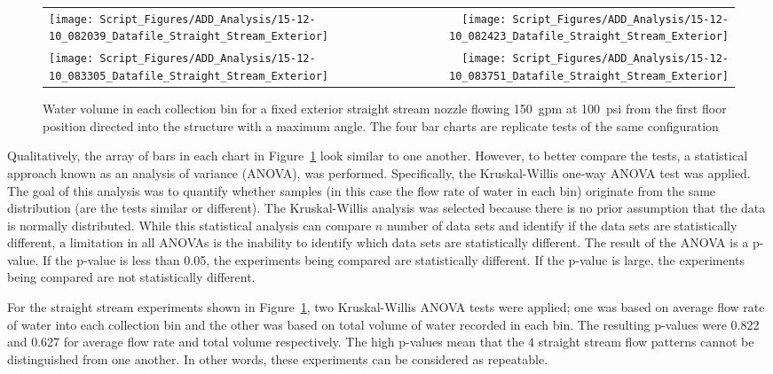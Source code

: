 \documentclass{article}
\begin{document}
\begin{figure}[ht]
\begin{tabular*}{\textwidth}{lr}
\texttt{[image: Script\_Figures/ADD\_Analysis/15-12-10\_082039\_Datafile\_Straight\_Stream\_Exterior]} &
\texttt{[image: Script\_Figures/ADD\_Analysis/15-12-10\_082423\_Datafile\_Straight\_Stream\_Exterior]} \\
\texttt{[image: Script\_Figures/ADD\_Analysis/15-12-10\_083305\_Datafile\_Straight\_Stream\_Exterior]} &
\texttt{[image: Script\_Figures/ADD\_Analysis/15-12-10\_083751\_Datafile\_Straight\_Stream\_Exterior]} \\
\end{tabular*}
\caption{Water volume in each collection bin for a fixed exterior straight stream nozzle flowing 150~gpm at 100~psi from the first floor position directed into the structure with a maximum angle. The four bar charts are replicate tests of the same configuration}
\label{fig:Repeatability_Testing}
\end{figure}

Qualitatively, the array of bars in each chart in Figure~\ref{fig:Repeatability_Testing} look similar to one another. However, to better compare the tests, a statistical approach known as an analysis of variance (ANOVA), was performed. Specifically, the Kruskal-Willis one-way ANOVA test was applied. The goal of this analysis was to quantify whether samples (in this case the flow rate of water in each bin) originate from the same distribution (are the tests similar or different). The Kruskal-Willis analysis was selected because there is no prior assumption that the data is normally distributed. While this statistical analysis can compare $n$ number of data sets and identify if the data sets are statistically different, a limitation in all ANOVAs is the inability to identify which data sets are statistically different. The result of the ANOVA is a p-value. If the p-value is less than 0.05, the experiments being compared are statistically different. If the p-value is large, the experiments being compared are not statistically different.

For the straight stream experiments shown in Figure~\ref{fig:Repeatability_Testing}, two Kruskal-Willis ANOVA tests were applied; one was based on average flow rate of water into each collection bin and the other was based on total volume of water recorded in each bin. The resulting p-values were 0.822 and 0.627 for average flow rate and total volume respectively. The high p-values mean that the 4 straight stream flow patterns cannot be distinguished from one another. In other words, these experiments can be considered as repeatable.
\end{document}
